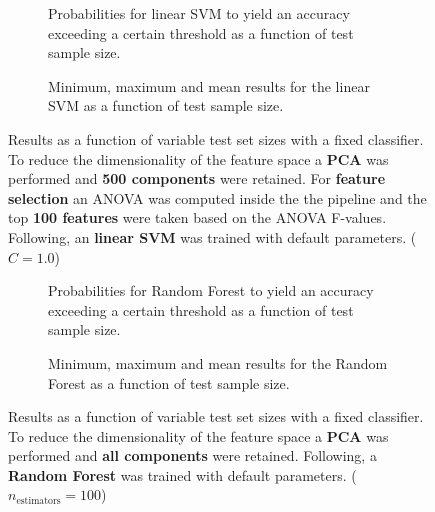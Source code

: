 \begin{figure}
    \captionsetup[subfigure]{justification=justified,singlelinecheck=false}
    \begin{subfigure}[t]{0.61\textwidth}
        
        \caption{Probabilities for linear SVM to yield an accuracy exceeding a certain threshold as a function of test sample size.}
    \end{subfigure}
    \hspace{3.0mm}
    \begin{subfigure}[t]{0.34\textwidth}
        
        \caption{Minimum, maximum and mean results for the linear SVM as a function of test sample size.}
    \end{subfigure}
    \caption[Effects of varying test sample size. Linear SVM; Preprocessing: PCA ($n_\text{components} = \num{500}$); ANOVA feature selection ($k_\text{best} = \num{100}$)]{Results as a function of variable test set sizes with a fixed classifier. To reduce the dimensionality of the feature space a \textbf{PCA} was performed and \textbf{\num{500} components} were retained. For \textbf{feature selection} an ANOVA was computed inside the the pipeline and the top \textbf{\num{100} features} were taken based on the ANOVA F-values. Following, an \textbf{{linear SVM}} was trained with default parameters. ($C=\num{1.0}$)}
    \label{fig:PCA_500_components_100_best_selected_LinearSVC}
\end{figure}

\begin{figure}
    \captionsetup[subfigure]{justification=justified,singlelinecheck=false}
    \begin{subfigure}[t]{0.61\textwidth}
        
        \caption{Probabilities for Random Forest to yield an accuracy exceeding a certain threshold as a function of test sample size.}
    \end{subfigure}
    \hspace{3.0mm}
    \begin{subfigure}[t]{0.34\textwidth}
        
        \caption{Minimum, maximum and mean results for the Random Forest as a function of test sample size.}
    \end{subfigure}
    \caption[Effects of varying test sample size. Random Forest; Preprocessing: PCA ($n_\text{components} = \text{all}$)]{Results as a function of variable test set sizes with a fixed classifier. To reduce the dimensionality of the feature space a \textbf{PCA} was performed and \textbf{all components} were retained. Following, a \textbf{{Random Forest}} was trained with default parameters. ($n_\text{estimators}=\num{100}$)}
    \label{fig:PCA_all_components_no_selection_RandomForest}
\end{figure}

